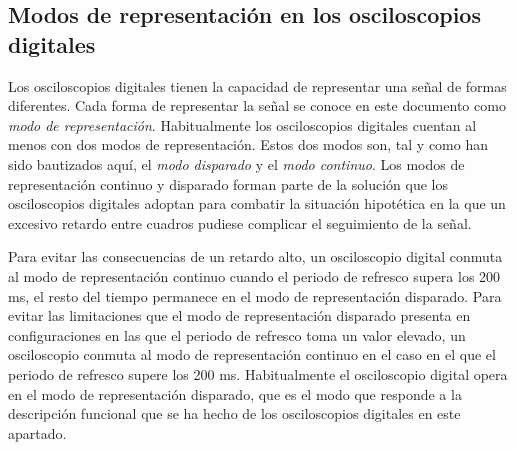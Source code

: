 \subsection{Modos de representación en los osciloscopios digitales}\label{subsec:repmodes}

Los osciloscopios digitales tienen la capacidad de representar una señal de formas diferentes. Cada forma de representar la señal se conoce en este documento como \emph{modo de representación}. Habitualmente los osciloscopios digitales cuentan al menos con dos modos de representación. Estos dos modos son, tal y como han sido bautizados aquí, el \emph{modo disparado} y el \emph{modo continuo}. Los modos de representación continuo y disparado forman parte de la solución que los osciloscopios digitales adoptan para combatir la situación hipotética en la que un excesivo retardo entre cuadros pudiese complicar el seguimiento de la señal.\par
Para evitar las consecuencias de un retardo alto, un osciloscopio digital conmuta al modo de representación continuo cuando el periodo de refresco supera los 200 ms, el resto del tiempo permanece en el modo de representación disparado. %
Para evitar las limitaciones que el modo de representación disparado presenta en configuraciones en las que el periodo de refresco toma un valor elevado, un osciloscopio conmuta al modo de representación continuo en el caso en el que el periodo de refresco supere los 200 ms. Habitualmente el osciloscopio digital opera en el modo de representación disparado, que es el modo que responde a la descripción funcional que se ha hecho de los osciloscopios digitales en este apartado.

